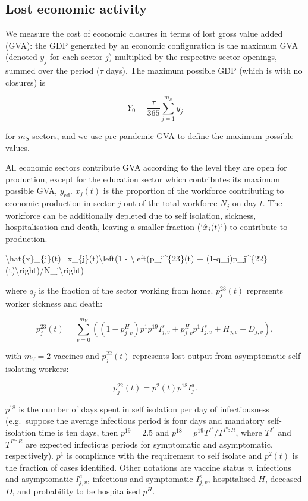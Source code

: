 \documentclass[
]{article}
\newenvironment{Shaded}{\begin{snugshade}}{\end{snugshade}}
\newcommand{\NormalTok}[1]{#1}
\begin{document}
\subsection{Lost economic activity}\label{lost-economic-activity}

We measure the cost of economic closures in terms of lost gross value added (GVA): the GDP generated by an economic configuration is the maximum GVA (denoted \(y_j\) for each sector \(j\)) multiplied by the respective sector openings, summed over the period (\(\tau\) days). The maximum possible GDP (which is with no closures) is

\[Y_0=\frac{\tau}{365}\sum_{j=1}^{m_S}y_j\]

for \(m_S\) sectors, and we use pre-pandemic GVA to define the maximum possible values.

All economic sectors contribute GVA according to the level they are open for production, except for the education sector which contributes its maximum possible GVA, \(y_{\text{ed}}\). \(x_{j}(t)\) is the proportion of the workforce contributing to economic production in sector \(j\) out of the total workforce \(N_j\) on day \(t\). The workforce can be additionally depleted due to self isolation, sickness, hospitalisation and death, leaving a smaller fraction (\(`\hat{x}_{j}(t)`\)) to contribute to production.

\begin{Shaded}
\begin{Highlighting}[]
\NormalTok{\textbackslash{}hat\{x\}\_\{j\}(t)=x\_\{j\}(t)\textbackslash{}left(1 {-} \textbackslash{}left(p\_j\^{}\{23\}(t)  + (1{-}q\_j)p\_j\^{}\{22\}(t)\textbackslash{}right)/N\_j\textbackslash{}right)}
\end{Highlighting}
\end{Shaded}

where \(q_j\) is the fraction of the sector working from home. \(p_j^{23}(t)\) represents worker sickness and death:

\[p_j^{23}(t)=\sum_{v=0}^{m_V}\left(\left(1-p^H_{j,v}\right)p^1p^{19}I_{j,v}^{s}+p^H_{j,v}p^1I_{j,v}^{s}+H_{j,v}+D_{j,v}\right),\]

with \(m_V=2\) vaccines and \(p_j^{22}(t)\) represents lost output from asymptomatic self-isolating workers:

\[p_j^{22}(t)=p^2(t)p^{18}I_{j}^{a}.\]

\(p^{18}\) is the number of days spent in self isolation per day of infectiousness (e.g.~suppose the average infectious period is four days and mandatory self-isolation time is ten days, then \(p^{19}=2.5\) and \(p^{18}=p^{19}T^{I^s}/T^{I^a:R}\), where \(T^{I^s}\) and \(T^{I^a:R}\) are expected infectious periods for symptomatic and asymptomatic, respectively). \(p^1\) is compliance with the requirement to self isolate and \(p^2(t)\) is the fraction of cases identified. Other notations are vaccine status \(v\), infectious and asymptomatic \(I_{j,v}^{a}\), infectious and symptomatic \(I_{j,v}^{s}\), hospitalised \(H\), deceased \(D\), and probability to be hospitalised \(p^H\).
\end{document}
